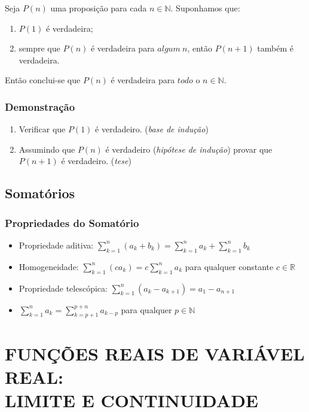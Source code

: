 \documentclass[11pt]{article}
\begin{document}
Seja $P(n)$ uma proposição para cada $n\in\mathbb{N}$. Suponhamos que:
\begin{enumerate}
    \item $P(1)$ é verdadeira;
    \item sempre que $P(n)$ é verdadeira para $algum\ n$, então $P(n+1)$ também é verdadeira.
\end{enumerate}
Então conclui-se que $P(n)$ é verdadeira para $todo$ o $n\in\mathbb{N}$.

\subsubsection{Demonstração}

\begin{enumerate}
    \item Verificar que $P(1)$ é verdadeiro. (\textit{base de indução})
    \item Assumindo que $P(n)$ é verdadeiro (\textit{hipótese de indução}) provar que $P(n+1)$ é verdadeiro. (\textit{tese})
\end{enumerate}

\subsection{Somatórios}

\subsubsection{Propriedades do Somatório}

\begin{itemize}
    \item Propriedade aditiva: $\displaystyle \sum_{k=1}^{n}\left(a_k+b_k\right) = \sum_{k=1}^{n}a_k + \sum_{k=1}^{n}b_k$
    \item Homogeneidade: $\displaystyle \sum_{k=1}^{n}(ca_k) = c \sum_{k=1}^{n}a_k$ para qualquer constante $c\in\mathbb{R}$
    \item Propriedade telescópica: $\displaystyle \sum_{k=1}^{n}(a_k-a_{k+1}) = a_1-a_{n+1}$
    \item $\displaystyle \sum_{k=1}^{n}a_k = \sum_{k=p+1}^{p+n}a_{k-p}$ para qualquer $p\in\mathbb{N}$
\end{itemize}

\newpage

\section{\MakeUppercase{Funções Reais de Variável Real: \\ Limite e Continuidade}}
\end{document}
